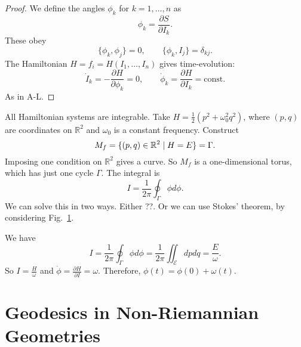 \begin{proof}
  We define the angles $\phi_k$ for $k = 1, \dots,  n$ as
  \begin{equation}
    \phi_k = \frac{\partial S}{\partial I_k}.
  \end{equation}
  These obey
  \begin{equation}
    \{ \phi_k, \phi_j \} = 0, \qquad \{ \phi_k, I_j \} = \delta_{kj}.
  \end{equation}
  The Hamiltonian $H = f_i = H(I_1, \dots, I_n)$ gives time-evolution:
  \begin{equation}
    \dot{I}_k = - \frac{\partial H}{\partial \phi_k} = 0, \qquad \dot{\phi}_k = \frac{\partial H}{\partial I_k} = \text{const.}
  \end{equation}
  As in A-L.
\end{proof}

\begin{example}[$M = \mathbb{R}^2$]
  All Hamiltonian systems are integrable.
  Take $H = \frac{1}{2}(p^2+ \omega_0^2 q^2)$, where $(p, q)$ are coordinates on $\mathbb{R}^2$ and $\omega_0$ is a constant frequency.
  Construct
  \begin{equation}
    M_f = \{(p, q) \in \mathbb{R}^2 \suchthat H = E\} = \Gamma.
  \end{equation}
  Imposing one condition on $\mathbb{R}^2$ gives a curve. So $M_f$ is a one-dimensional torus, which has just one cycle $\Gamma$.
  The integral is
  \begin{equation}
    I = \frac{1}{2\pi} \oint_\Gamma \phi d\phi.
  \end{equation}
  We can solve this in two ways. Either ??.
  Or we can use Stokes' theorem, by considering Fig.~\ref{fig:l9f3}.
  \begin{figure}[tbhp]
    \centering
    \def\svgwidth{0.4\columnwidth}
    
    \caption{}
    \label{fig:l9f3}
  \end{figure}
  We have
  \begin{equation}
    I = \frac{1}{2\pi} \oint_\Gamma \phi d\phi = \frac{1}{2\pi} \iint_{\mathcal{E}} dp dq = \frac{E}{\omega}.
  \end{equation}
  So $I = \frac{H}{\omega}$ and $\dot{\phi} = \frac{\partial H}{\partial I} = \omega$. Therefore, $\phi(t) = \phi(0) + \omega (t)$.
\end{example}

\section{Geodesics in Non-Riemannian Geometries}%
\label{sec:geodesics_in_non_riemannian_geometries}

